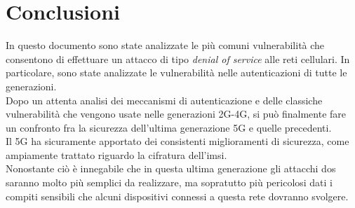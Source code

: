 \chapter{Conclusioni}
In questo documento sono state analizzate le più comuni vulnerabilità che consentono di effettuare un 
attacco di tipo \textit{denial of service} alle reti cellulari. In particolare, sono state analizzate le vulnerabilità nelle autenticazioni 
di tutte le generazioni.\\
Dopo un attenta analisi dei meccanismi di autenticazione e delle classiche vulnerabilità che vengono usate nelle generazioni 2G-4G, si può finalmente
fare un confronto fra la sicurezza dell'ultima generazione 5G e quelle precedenti.\\
Il 5G ha sicuramente apportato dei consistenti miglioramenti di sicurezza, come ampiamente trattato riguardo la cifratura dell'\gls{imsi}.\\
Nonostante ciò è innegabile che in questa ultima generazione gli attacchi \gls{dos} saranno molto più semplici da realizzare, ma sopratutto più pericolosi dati
i compiti sensibili che alcuni dispositivi connessi a questa rete dovranno svolgere.